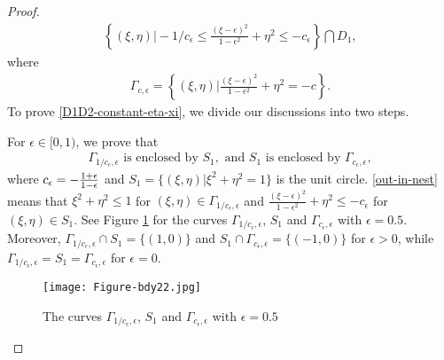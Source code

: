 \documentclass[1 [leqno, 11pt]{amsart}
\numberwithin{equation}{section}
\let\ep=\epsilon
\begin{document}
\begin{CJK*}{GBK}{song}
\begin{proof}
\begin{align*}
\left\{(\xi,\eta)\bigg|-1/c_\ep\leq\frac{(\xi - \ep)^2}{1-\ep^2} + \eta^2\leq -c_\ep\right\}\bigcap D_1,
\end{align*}
where
\begin{align*}
\Gamma_{c,\ep}=\left\{(\xi,\eta)\bigg|\frac{(\xi - \ep)^2}{1-\ep^2} + \eta^2=-c\right\}.
\end{align*}
To prove \eqref{D1D2-constant-eta-xi},
 we divide our discussions into two steps.
\vspace{0.5mm}

 For $\ep\in[0,1)$, we prove that
\begin{align}\label{out-in-nest}
\Gamma_{1/c_\ep,\ep}\text{  is  enclosed by } S_1, \text{ and }{S}_1\text{  is  enclosed by } \Gamma_{c_\ep,\ep},
\end{align}
where $c_\ep=-{1+\ep\over 1-\ep}$ and $S_1=\{(\xi,\eta)|\xi^2+\eta^2=1\}$ is the unit circle.
\eqref{out-in-nest} means that $\xi^2+\eta^2\leq1$ for $(\xi,\eta)\in\Gamma_{1/c_\ep,\ep}$ and $\frac{(\xi - \ep)^2}{1-\ep^2} + \eta^2\leq-c_\ep$ for $(\xi,\eta)\in S_1$.
See Figure \ref{fig3th:bdy22} for the curves  $\Gamma_{1/c_\ep,\ep}$, $S_1$ and $\Gamma_{c_\ep,\ep}$ with $\ep=0.5$.
Moreover, $\Gamma_{1/c_\ep,\ep}\cap S_1=\{(1,0)\}$ and ${S}_1\cap\Gamma_{c_\ep,\ep}=\{(-1,0)\}$ for $\ep>0$, while $\Gamma_{1/c_\ep,\ep}= S_1=\Gamma_{c_\ep,\ep}$ for $\ep=0$.
\begin{figure}[ht]
    \centering
	\texttt{[image: Figure-bdy22.jpg]}
	\caption{The curves $\Gamma_{1/c_\ep,\ep}$, $S_1$ and $\Gamma_{c_\ep,\ep}$ with $\ep=0.5$}
	\label{fig3th:bdy22}
\end{figure}






\end{proof}
\end{CJK*}
\end{document}
